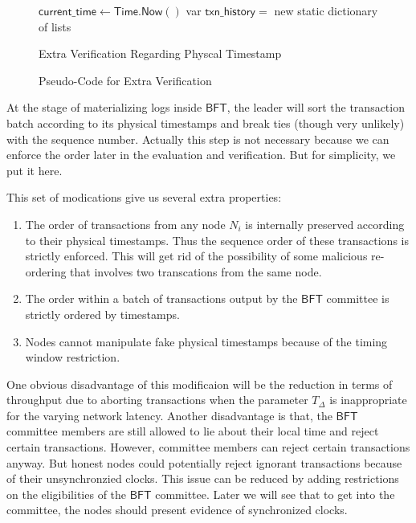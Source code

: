 \begin{figure*}
\begin{algorithm}[H]
$\mathsf{current\_time} \gets \mathsf{Time.Now()}$\;
var $\mathsf{txn\_history=}$ new static dictionary of lists\;
\caption{Extra Verification Regarding Physcal Timestamp}
\label{alg:timestamp}
\end{algorithm}
\caption{Pseudo-Code for Extra Verification}
\end{figure*}

At the stage of materializing logs inside $\mathsf{BFT}$, the leader will sort the transaction batch according to its physical timestamps and break ties
(though very unlikely) with the sequence number. Actually this step is not necessary because we can enforce the order later in the evaluation and verification.
But for simplicity, we put it here.

This set of modications give us several extra properties:

\begin{enumerate}
\item The order of transactions from any node $N_i$ is internally preserved according to their physical timestamps. Thus the sequence order of these transactions
is strictly enforced. This will get rid of the possibility of some malicious re-ordering that involves two transcations from the same node.
\item The order within a batch of transactions output by the $\mathsf{BFT}$ committee is strictly ordered by timestamps.
\item Nodes cannot manipulate fake physical timestamps because of the timing window restriction.
\end{enumerate}

One obvious disadvantage of this modificaion will be the reduction in terms of throughput due to aborting transactions when the parameter $T_\Delta$ is inappropriate
for the varying network latency. Another disadvantage is that, the $\mathsf{BFT}$ committee members are still allowed to lie about their local time and reject certain
transactions. However, committee members can reject certain transactions anyway. But honest nodes could potentially reject ignorant transactions because of their
unsynchronzied clocks. This issue can be reduced by adding restrictions on the eligibilities of the $\mathsf{BFT}$ committee. Later we will see that to get into
the committee, the nodes should present evidence of synchronized clocks.

